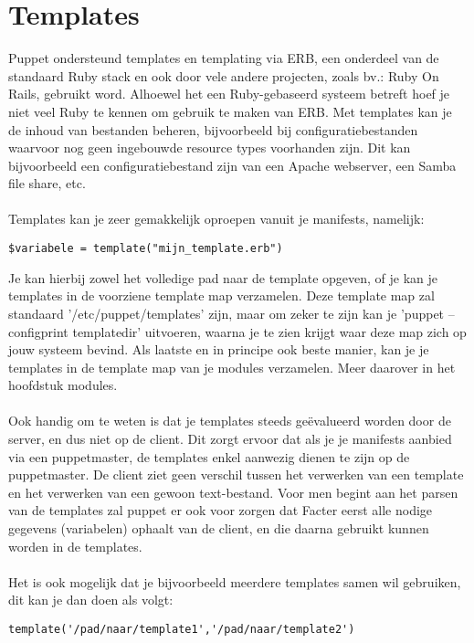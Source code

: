 \chapter{Templates}

Puppet ondersteund templates en templating via ERB, een onderdeel van de standaard Ruby stack en ook door vele andere projecten, zoals bv.: Ruby On Rails, gebruikt word. Alhoewel het een Ruby-gebaseerd systeem betreft hoef je niet veel Ruby te kennen om gebruik te maken van ERB. Met templates kan je de inhoud van bestanden beheren, bijvoorbeeld bij configuratiebestanden waarvoor nog geen ingebouwde resource types voorhanden zijn. Dit kan bijvoorbeeld een configuratiebestand zijn van een Apache webserver, een Samba file share, etc.\\\\
Templates kan je zeer gemakkelijk oproepen vanuit je manifests, namelijk:
\begin{code}
\begin{lstlisting}
$variabele = template("mijn_template.erb")
\end{lstlisting}
\end{code}
Je kan hierbij zowel het volledige pad naar de template opgeven, of je kan je templates in de voorziene template map verzamelen. Deze template map zal standaard '/etc/puppet/templates' zijn, maar om zeker te zijn kan je 'puppet --configprint templatedir' uitvoeren, waarna je te zien krijgt waar deze map zich op jouw systeem bevind. Als laatste en in principe ook beste manier, kan je je templates in de template map van je modules verzamelen. Meer daarover in het hoofdstuk modules.\\\\
Ook handig om te weten is dat je templates steeds ge\"{e}valueerd worden door de server, en dus niet op de client. Dit zorgt ervoor dat als je je manifests aanbied via een puppetmaster, de templates enkel aanwezig dienen te zijn op de puppetmaster. De client ziet geen verschil tussen het verwerken van een template en het verwerken van een gewoon text-bestand. Voor men begint aan het parsen van de templates zal puppet er ook voor zorgen dat Facter eerst alle nodige gegevens (variabelen) ophaalt van de client, en die daarna gebruikt kunnen worden in de templates.\\\\
Het is ook mogelijk dat je bijvoorbeeld meerdere templates samen wil gebruiken, dit kan je dan doen als volgt:
\begin{code}
\begin{lstlisting}
template('/pad/naar/template1','/pad/naar/template2')
\end{lstlisting}
\end{code}
